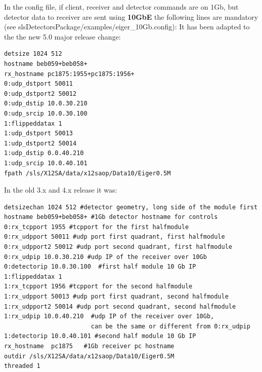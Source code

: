 \documentclass{article}
\begin{document}
In the config file, if client, receiver and detector commands are on 1Gb, but detector data to receiver are sent using \textbf{10GbE} the following lines are mandatory (see slsDetectorsPackage/examples/eiger\_10Gb.config):
 It has been adapted to the the new 5.0 major release change:
\begin{verbatim}
detsize 1024 512
hostname beb059+beb058+ 
rx_hostname pc1875:1955+pc1875:1956+
0:udp_dstport 50011
0:udp_dstport2 50012
0:udp_dstip 10.0.30.210 
0:udp_srcip 10.0.30.100  
1:flippeddatax 1
1:udp_dstport 50013
1:udp_dstport2 50014
1:udp_dstip 0.0.40.210 
1:udp_srcip 10.0.40.101
fpath /sls/X12SA/data/x12saop/Data10/Eiger0.5M
\end{verbatim}
In the old 3.x and 4.x release it was: 
\begin{verbatim}
detsizechan 1024 512 #detector geometry, long side of the module first
hostname beb059+beb058+ #1Gb detector hostname for controls
0:rx_tcpport 1955 #tcpport for the first halfmodule                 
0:rx_udpport 50011 #udp port first quadrant, first halfmodule       
0:rx_udpport2 50012 #udp port second quadrant, first halfmodule       
0:rx_udpip 10.0.30.210 #udp IP of the receiver over 10Gb              
0:detectorip 10.0.30.100  #first half module 10 Gb IP 
1:flippeddatax 1
1:rx_tcpport 1956 #tcpport for the second halfmodule                  
1:rx_udpport 50013 #udp port first quadrant, second halfmodule     
1:rx_udpport2 50014 #udp port second quadrant, second halfmodule  
1:rx_udpip 10.0.40.210  #udp IP of the receiver over 10Gb, 
                        can be the same or different from 0:rx_udpip                                   
1:detectorip 10.0.40.101 #second half module 10 Gb IP 
rx_hostname  pc1875   #1Gb receiver pc hostname
outdir /sls/X12SA/data/x12saop/Data10/Eiger0.5M
threaded 1
\end{verbatim}
\end{document}
